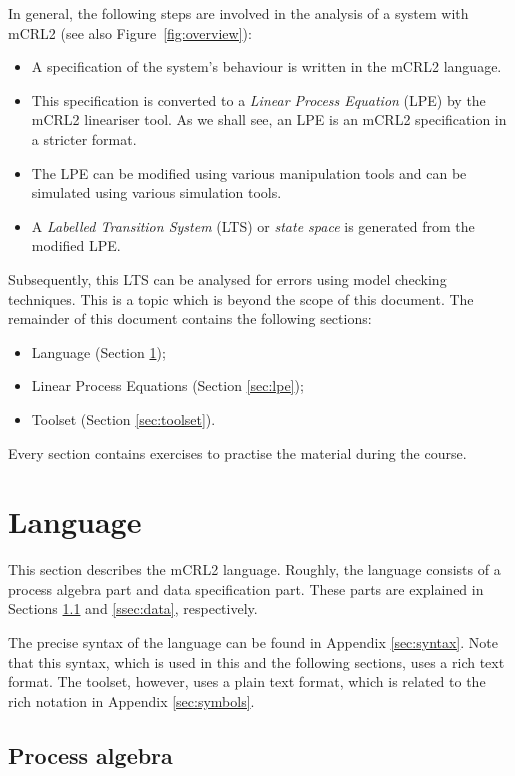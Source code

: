 \documentclass[a4paper,fleqn]{article}
\begin{document}
In general, the following steps are involved in the analysis of a system with
mCRL2 (see also Figure~\ref{fig:overview}):
\begin{itemize}
  \item A specification of the system's behaviour is written in the mCRL2
    language.
  \item This specification is converted to a \emph{Linear Process Equation}
    (LPE) by the mCRL2 lineariser tool. As we shall see, an LPE is an
    mCRL2 specification in a stricter format.
  \item The LPE can be modified using various manipulation tools and can be
    simulated using various simulation tools.
  \item A \emph{Labelled Transition System} (LTS) or \emph{state space} is
    generated from the modified LPE.
\end{itemize}

\noindent Subsequently, this LTS can be analysed for errors using model
checking techniques. This is a topic which is beyond the scope of this
document. The remainder of this document contains the following sections:
\begin{itemize}
  \item Language (Section \ref{sec:language});
  \item Linear Process Equations (Section \ref{sec:lpe});
  \item Toolset (Section \ref{sec:toolset}).
\end{itemize}

\noindent Every section contains exercises to practise the material during the
course. 

\section{Language}
\label{sec:language}

This section describes the mCRL2 language. Roughly, the language consists of
a process algebra part and data specification part. These parts are explained
in Sections \ref{ssec:process algebra} and \ref{ssec:data}, respectively.

The precise syntax of the language can be found in Appendix \ref{sec:syntax}.
Note that this syntax, which is used in this and the following sections, uses a
rich text format. The toolset, however, uses a plain text format, which is
related to the rich notation in Appendix \ref{sec:symbols}.

\subsection{Process algebra}
\label{ssec:process algebra}
\end{document}
